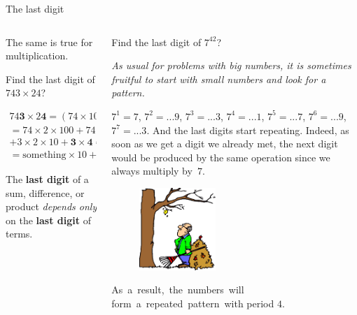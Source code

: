 \documentclass[9pt,aspectratio=169]{beamer}
\begin{document}
\begin{frame}{The last digit}
\begin{columns}[T]
\begin{column}{0.5\textwidth}
      The same is true for multiplication.
      \begin{problem}
        Find the last digit of $743 \times 24$?
      \end{problem}\vspace*{-1.2\baselineskip}
      \begin{multline*}
        74\mathbf{3} \times 2\mathbf{4} = (74 \times 10 + \mathbf{3}) (2 \times 10 + \mathbf{4}) = \\ 
        = 74 \times 2 \times 100 + 74 \times 4 \times 10 + {} \\
         + 3 \times 2 \times 10 + \mathbf{3} \times \mathbf{4} = \\
        = \text{something} \times 10 + \mathbf{12} = (\text{something} + 1) \times 10 + \mathbf{2}.
      \end{multline*}\vspace*{-0.8\baselineskip}
      \begin{definition}
        The \textbf{last digit} of a sum, difference, or product \emph{depends only} on the \textbf{last digit} of terms.
      \end{definition}
    \end{column}
    \begin{column}{0.5\textwidth}
      \begin{problem}
        Find the last digit of $7^{42}$?
      \end{problem}
      \begin{example}
        \emph{As usual for problems with big numbers, it is sometimes fruitful to start with small numbers and look for a pattern.}
      \end{example}

      $7^1 = 7$, $7^2 = ...9$, $7^3 = ...3$, $7^4 = ...1$, $7^5 = ...7$, $7^6 = ...9$, $7^7 = ...3$.
      And the last digits start repeating. Indeed, as soon as we get a digit we already met, the next digit would be produced by the same operation since we always multiply by~$7$.
      \begin{figure}
        \vspace*{-0.5em}
        \hspace*{-1.3em}
        \includegraphics[width=0.4\textwidth]{05 - Number Theory 102/the-last-one-leaf.png}
      \end{figure}
      As~a~result,~the~numbers~will form~a~repeated~pattern~with period $4$. 


\end{column}
\end{columns}
\end{frame}
\end{document}
